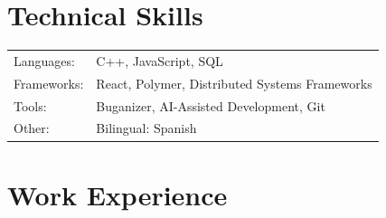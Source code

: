 \documentclass[a4paper,12pt]{article}
\begin{document}
\section{Technical Skills}
\begin{tabularx}{\linewidth}{@{}l X@{}}
    Languages: &  \normalsize{C++, JavaScript, SQL}\\
    Frameworks: & \normalsize{React, Polymer, Distributed Systems Frameworks}\\
    Tools: & \normalsize{Buganizer, AI-Assisted Development, Git}\\
    Other: & \normalsize{Bilingual: Spanish}\\
\end{tabularx}

\section{Work Experience}
\end{document}
